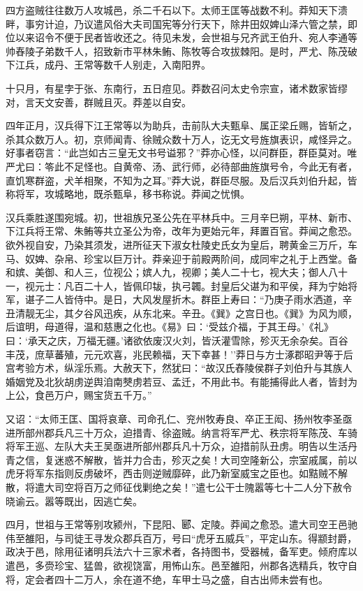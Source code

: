 \documentclass[]{article}
\begin{document}
四方盗贼往往数万人攻城邑，杀二千石以下。太师王匡等战数不利。莽知天下溃畔，事穷计迫，乃议遣风俗大夫司国宪等分行天下，除井田奴婢山泽六管之禁，即位以来诏令不便于民者皆收还之。待见未发，会世祖与兄齐武王伯升、宛人李通等帅舂陵子弟数千人，招致新市平林朱鲔、陈牧等合攻拔棘阳。是时，严尤、陈茂破下江兵，成丹、王常等数千人别走，入南阳界。

十只月，有星孛于张、东南行，五日痘见。莽数召问太史令宗宣，诸术数家皆缪对，言天文安善，群贼且灭。莽差以自安。

四年正月，汉兵得下江王常等以为助兵，击前队大夫甄阜、属正梁丘赐，皆斩之，杀其众数万人。初，京师闻青、徐贼众数十万人，讫无文号旌旗表识，咸怪异之。好事者窃言：``此岂如古三皇无文书号谥邪？''莽亦心怪，以问群臣，群臣莫对。唯严尤曰：笭此不足怪也。自黄帝、汤、武行师，必待部曲旌旗号令，今此无有者，直饥寒群盗，犬羊相聚，不知为之耳。''莽大说，群臣尽服。及后汉兵刘伯升起，皆称将军，攻城略地，既杀甄阜，移书称说。莽闻之忧惧。

汉兵乘胜遂围宛城。初，世祖族兄圣公先在平林兵中。三月辛巳朔，平林、新市、下江兵将王常、朱鲔等共立圣公为帝，改年为更始元年，拜置百官。莽闻之愈恐。欲外视自安，乃染其须发，进所征天下淑女杜陵史氏女为皇后，聘黄金三万斤，车马、奴婢、杂帛、珍宝以巨万计。莽亲迎于前殿两阶间，成同牢之礼于上西堂。备和嫔、美御、和人三，位视公；嫔人九，视卿；美人二十七，视大夫；御人八十一，视元士：凡百二十人，皆佩印韨，执弓韣。封皇后父谌为和平侯，拜为宁始将军，谌子二人皆侍中。是日，大风发屋折木。群臣上寿曰：``乃庚子雨水洒道，辛丑清靓无尘，其夕谷风迅疾，从东北来。辛丑。《巽》之宫日也。《巽》为风为顺，后谊明，母道得，温和慈惠之化也。《易》曰：`受兹介福，于其王母。'《礼》曰：`承天之庆，万福无疆。'诸欲依废汉火刘，皆沃灌雪除，殄灭无余杂矣。百谷丰茂，庶草蕃殖，元元欢喜，兆民赖福，天下幸甚！''莽日与方士涿郡昭尹等于后宫考验方术，纵淫乐焉。大赦天下，然犹曰：``故汉氏舂陵侯群子刘伯升与其族人婚姻党及北狄胡虏逆舆洎南僰虏若豆、孟迁，不用此书。有能捕得此人者，皆封为上公，食邑万户，赐宝货五千万。''

又诏：``太师王匡、国将哀章、司命孔仁、兖州牧寿良、卒正王闳、扬州牧李圣亟进所部州郡兵凡三十万众，迫措青、徐盗贼。纳言将军严尤、秩宗将军陈茂、车骑将军王巡、左队大夫王吴亟进所部州郡兵凡十万众，迫措前队丑虏。明告以生活丹青之信，复迷惑不解散，皆并力合击，殄灭之矣！大司空隆新公，宗室戚属，前以虎牙将军东指则反虏破坏，西击则逆贼靡碎，此乃新室威宝之臣也。如黠贼不解散，将遣大司空将百万之师征伐剿绝之矣！''遣七公干士隗嚣等七十二人分下赦令晓谕云。嚣等既出，因逃亡矣。

四月，世祖与王常等别攻颍州，下昆阳、郾、定陵。莽闻之愈恐。遣大司空王邑驰伟至雒阳，与司徒王寻发众郡兵百万，号曰``虎牙五威兵''，平定山东。得颛封爵，政决于邑，除用征诸明兵法六十三家术者，各持图书，受器械，备军吏。倾府库以遣邑，多赍珍宝、猛兽，欲视饶富，用怖山东。邑至雒阳，州郡各选精兵，牧守自将，定会者四十二万人，余在道不绝，车甲士马之盛，自古出师未尝有也。
\end{document}
